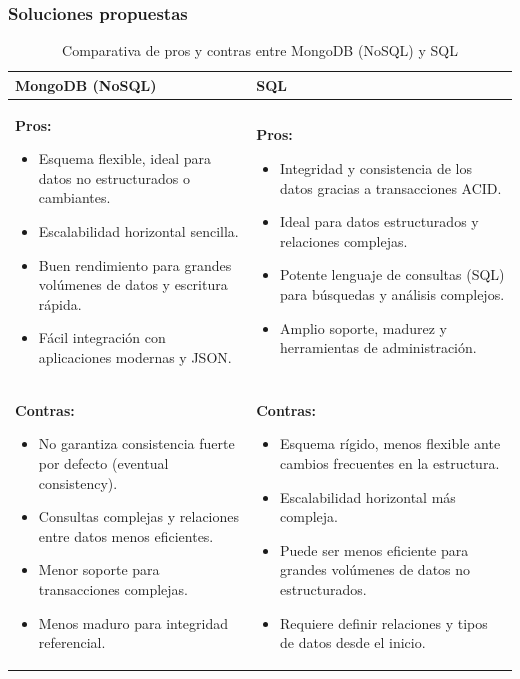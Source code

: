 \documentclass{article}
\begin{document}
\subsubsection{Soluciones propuestas}
\begin{enumerate}
    \begin{table}[h!]
    \centering
    \begin{tabular}{|p{6cm}|p{6cm}|}
    \hline
    \textbf{MongoDB (NoSQL)} & \textbf{SQL} \\
    \hline
    \textbf{Pros:}
    \begin{itemize}
        \item Esquema flexible, ideal para datos no estructurados o cambiantes.
        \item Escalabilidad horizontal sencilla.
        \item Buen rendimiento para grandes volúmenes de datos y escritura rápida.
        \item Fácil integración con aplicaciones modernas y JSON.
    \end{itemize}
    &
    \textbf{Pros:}
    \begin{itemize}
        \item Integridad y consistencia de los datos gracias a transacciones ACID.
        \item Ideal para datos estructurados y relaciones complejas.
        \item Potente lenguaje de consultas (SQL) para búsquedas y análisis complejos.
        \item Amplio soporte, madurez y herramientas de administración.
    \end{itemize}
    \\
    \hline
    \textbf{Contras:}
    \begin{itemize}
        \item No garantiza consistencia fuerte por defecto (eventual consistency).
        \item Consultas complejas y relaciones entre datos menos eficientes.
        \item Menor soporte para transacciones complejas.
        \item Menos maduro para integridad referencial.
    \end{itemize}
    &
    \textbf{Contras:}
    \begin{itemize}
        \item Esquema rígido, menos flexible ante cambios frecuentes en la estructura.
        \item Escalabilidad horizontal más compleja.
        \item Puede ser menos eficiente para grandes volúmenes de datos no estructurados.
        \item Requiere definir relaciones y tipos de datos desde el inicio.
    \end{itemize}
    \\
    \hline
    \end{tabular}
    \caption{Comparativa de pros y contras entre MongoDB (NoSQL) y SQL}
    \end{table}
    

\end{enumerate}
\end{document}
